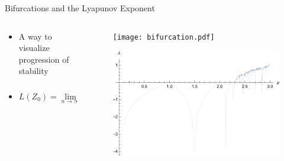 \documentclass{beamer}
\begin{document}
\begin{frame}{Bifurcations and the Lyapunov Exponent}
	\begin{columns}
		\begin{column}{0.5\textwidth}
			\begin{itemize}
				\item
					A way to visualize progression of stability
				\item
					\begin{equation*}
						L(Z_0)=\lim\limits_{n\to\infty}\frac{1}{n}\sum\limits_{i=1}^{i=n}\ln\lvert f^\prime(Z_{i-1}\rvert)
					\end{equation*}
			\end{itemize}
		\end{column}
		\begin{column}{0.5\textwidth}
			\begin{figure}
				\centering
				\texttt{[image: bifurcation.pdf]}
			\end{figure}
			\begin{figure}
				\centering
				\includegraphics[height=0.3\textheight]{lyapunov.pdf}
			\end{figure}
		\end{column}
	\end{columns}
\end{frame}
\end{document}

